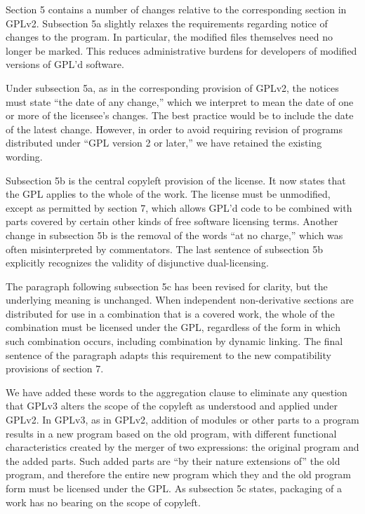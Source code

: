 
Section 5 contains a number of changes relative to the corresponding section
in GPLv2. Subsection 5a slightly relaxes the requirements regarding notice of
changes to the program. In particular, the modified files themselves need no
longer be marked. This reduces administrative burdens for developers of
modified versions of GPL'd software.

Under subsection 5a, as in the corresponding provision of GPLv2, the notices
must state ``the date of any change,'' which we interpret to mean the date of
one or more of the licensee's changes.  The best practice would be to include
the date of the latest change.  However, in order to avoid requiring revision
of programs distributed under ``GPL version 2 or later,'' we have retained
the existing wording.


Subsection 5b is the central copyleft provision of the license.  It now
states that the GPL applies to the whole of the work.  The license must be
unmodified, except as permitted by section 7, which allows GPL'd code to be
combined with parts covered by certain other kinds of free software licensing
terms. Another change in subsection 5b is the removal of the words ``at no
charge,'' which was often misinterpreted by commentators.  The last sentence
of subsection 5b explicitly recognizes the validity of disjunctive
dual-licensing.




The paragraph following subsection 5c has been revised for clarity, but the
underlying meaning is unchanged. When independent non-derivative sections are
distributed for use in a combination that is a covered work, the whole of the
combination must be licensed under the GPL, regardless of the form in which
such combination occurs, including combination by dynamic linking. The final
sentence of the paragraph adapts this requirement to the new compatibility
provisions of section 7.

We have added these words to the aggregation clause to eliminate any question
that GPLv3 alters the scope of the copyleft as understood and applied under
GPLv2. In GPLv3, as in GPLv2, addition of modules or other parts to a program
results in a new program based on the old program, with different functional
characteristics created by the merger of two expressions: the original
program and the added parts.  Such added parts are ``by their nature
extensions of'' the old program, and therefore the entire new program which
they and the old program form must be licensed under the GPL.  As subsection
5c states, packaging of a work has no bearing on the scope of copyleft.


